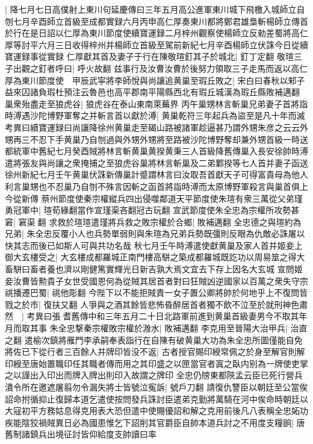 |{
	降七月七日高僕射上東川句延慶傳曰三年五月高公進軍東川城下飛檄入城師立自刎七月辛酉師立首級至成都實録六月丙申高仁厚奏東川都將鄭君雄梟斬楊師立傳首於行在是日詔以仁厚為東川節度使續寶運録二月梓州觀察使楊師立反勑差蜀將高仁厚等討平六月三日收得梓州并楊師立首級至駕前新紀七月辛酉楊師立伏誅今日從續寶運録事從實録}
仁厚獻其首及妻子于行在陳敬瑄釘其子於城北|{
	釘丁定翻}
敬瑄三子出觀之釘者呼曰|{
	呼火故翻}
兹事行及汝曹汝曹於後努力領取三子走馬而返以高仁厚為東川節度使　甲辰武寜將李師悅與尚讓追黄巢至瑕丘敗之|{
	宋白曰春秋以邾子益來囚諸負瑕杜預注云魯邑也高平郡南平陽縣西北有瑕丘城漢為瑕丘縣敗補邁翻}
巢衆殆盡走至狼虎谷|{
	狼虎谷在泰山東南萊蕪界}
丙午巢甥林言斬巢兄弟妻子首將詣時溥遇沙陀博野軍奪之并斬言首以獻於溥|{
	黄巢乾符三年起兵為盜至是凡十年而滅　考異曰續寶運録曰尚讓降徐州黄巢走至碣山路被諸軍趁逼甚乃謂外甥朱彦之云云外甥再三不忍下手黄巢乃自刎過與外甥外甥將至路被沙陀博野奪却兼外甥首級一時送都統軍中舊紀七月癸酉賊將林言斬黄巢黄揆黄秉三人首級降舊傳巢入長安徐帥時溥遣將張友與尚讓之衆掩捕之至狼虎谷巢將林言斬巢及二弟鄴揆等七人首并妻子函送徐州新紀七月壬午黄巢伏誅新傳巢計蹙謂林言曰汝取吾首獻天子可得富貴母為他人利言巢甥也不忍巢乃自刎不殊言因斬之函首將詣時溥而太原博野軍殺言與巢首俱上今從新傳}
蔡州節度使秦宗權縱兵四出侵噬鄰道天平節度使朱瑄有衆三萬從父弟瑾勇冠軍中|{
	瑄荀緣翻當作宣瑾渠吝翻冠古玩翻}
宣武節度使朱全忠為宗權所攻勢甚窘|{
	窘渠翻}
求救於瑄瑄遣瑾將兵救之敗宗權於合鄉|{
	敗補邁翻}
全忠德之與瑄約為兄弟|{
	朱全忠反覆小人也兵勢單弱則與朱瑄為兄弟兵勢既彊則反眼為仇敵必誅屠以快其志而後已如斯人可與共功名哉}
秋七月壬午時溥遣使獻黄巢及家人首并姬妾上御大玄樓受之|{
	大玄樓成都羅城正南門樓高駢之築成都羅城既訖功以周易筮之得大畜駢曰畜者養也濟以剛健篤實輝光日新吉孰大焉文宜去下存上因名大玄城}
宣問姬妾汝曹皆勲貴子女世受國恩何為從賊其居首者對曰狂賊凶逆國家以百萬之衆失守宗祧播遷巴蜀|{
	祧他彫翻}
今陛下以不能拒賊責一女子置公卿將帥於何地乎上不復問皆戮之於市|{
	復扶又翻}
人爭與之酒其餘皆悲怖昏醉居首者獨不飲不泣至於就刑神色肅然　|{
	考異曰張耆舊傳中和三年五月二十日北路軍前進到黄巢首級妻男今不取其年月而取其事}
朱全忠撃秦宗權敗宗權於溵水|{
	敗補邁翻}
李克用至晉陽大治甲兵|{
	治直之翻}
遣榆次鎮將雁門李承嗣奉表詣行在自陳有破黄巢大功為朱全忠所圖僅能自免將佐已下從行者三百餘人并牌印皆没不返|{
	古者授官賜印綬常佩之於身至解官則解印綬至唐始置職印任其職者傳而用之其印盛之以匣當官者寘之臥内别為一牌使吏掌之以謹出入印出而牌入牌出則印入故謂之牌印}
全忠仍牓東都陝孟云臣已死行營兵潰令所在邀遮屠翦勿令漏失將士皆號泣寃訴|{
	號戶刀翻}
請復仇讐臣以朝廷至公當俟詔命拊循抑止復歸本道乞遣使按問發兵誅討臣遣弟克勤將萬騎在河中俟命時朝廷以大寇初平方務姑息得克用表大恐但遣中使賜優詔和解之克用前後凡八表稱全忠妬功疾能陰狡禍賊異日必為國患惟乞下詔削其官爵臣自帥本道兵討之不用度支糧餉|{
	唐舊制諸鎮兵出境征討皆仰給度支帥讀曰率}
